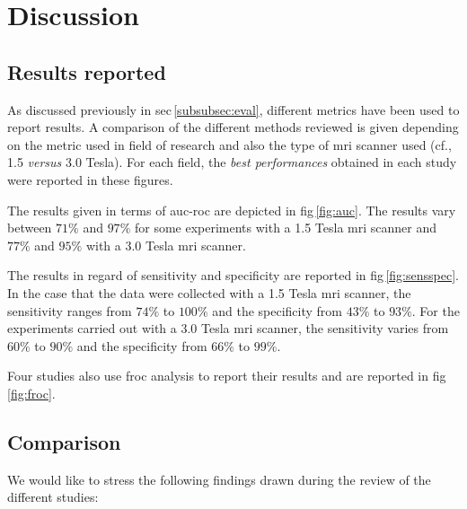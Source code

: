 \section{Discussion} \label{sec:discussion}

\subsection{Results reported}

As discussed previously in \ac{sec}\,\ref{subsubsec:eval}, different metrics have been used to report results. A comparison of the different methods reviewed is given depending on the metric used in field of research and also the type of \ac{mri} scanner used (cf., 1.5 \textit{versus} 3.0 Tesla). For each field, the \textit{best performances} obtained in each study were reported in these figures.

The results given in terms of \ac{auc}-\ac{roc} are depicted in \ac{fig}\,\ref{fig:auc}. The results vary between $71\%$ and $97\%$ for some experiments with a 1.5 Tesla \ac{mri} scanner and $77\%$ and $95\%$ with a 3.0 Tesla \ac{mri} scanner. 

The results in regard of sensitivity and specificity are reported in \ac{fig}\,\ref{fig:sensspec}. In the case that the data were collected with a 1.5 Tesla \ac{mri} scanner, the sensitivity ranges from $74\%$ to $100\%$ and the specificity from $43\%$ to $93\%$. For the experiments carried out with a 3.0 Tesla \ac{mri} scanner, the sensitivity varies from $60\%$ to $90\%$ and the specificity from $66\%$ to $99\%$.

Four studies also use \ac{froc} analysis to report their results and are reported in \ac{fig}\,\ref{fig:froc}.

\subsection{Comparison}

We would like to stress the following findings drawn during the review of the different studies:

